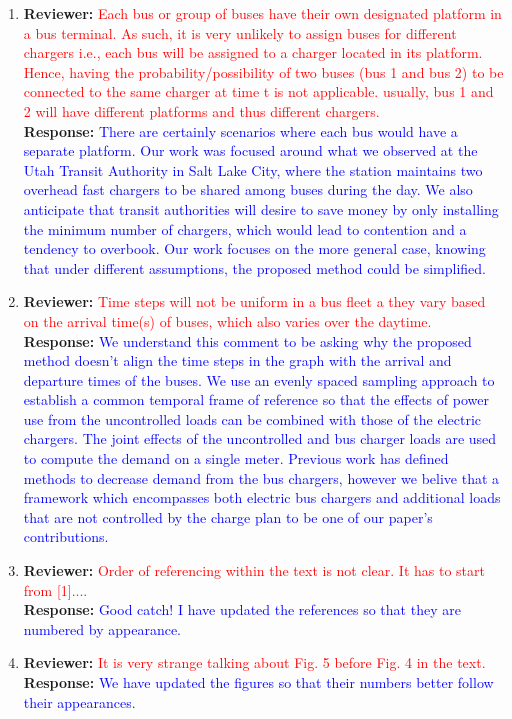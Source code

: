 \documentclass{article}
\newcommand\formatfeedback[2]
{%
	\textbf{Reviewer:} \textcolor{red}{#1} 
	\leavevmode\\[0.1in] \textbf{Response:} \textcolor{blue}{#2}
}
\begin{document}
\begin{enumerate}
	\item \formatfeedback{Each bus or group of buses have their own designated platform in a bus terminal. As such, it is very unlikely to assign buses for different chargers i.e., each bus will be assigned to a charger located in its platform. Hence, having the probability/possibility of  two buses (bus 1 and bus 2) to be connected to the same charger at time t is not applicable. usually, bus 1 and 2 will have different platforms and thus different chargers.}{There are certainly scenarios where each bus would have a separate platform. Our work was focused around what we observed at the Utah Transit Authority in Salt Lake City, where the station maintains two overhead fast chargers to be shared among buses during the day. We also anticipate that transit authorities will desire to save money by only installing the minimum number of chargers, which would lead to contention and a tendency to overbook. Our work focuses on the more general case, knowing that under different assumptions, the proposed method could be simplified.}
	\item \formatfeedback{Time steps will not be uniform in a bus fleet a they vary based on the arrival time(s) of buses, which also varies over the daytime.}{ We understand this comment to be asking why the proposed method doesn't align the time steps in the graph with the arrival and departure times of the buses. We use an evenly spaced sampling approach to establish a common temporal frame of reference so that the effects of power use from the uncontrolled loads can be combined with those of the electric chargers. The joint effects of the uncontrolled and bus charger loads are used to compute the demand on a single meter. Previous work has defined methods to decrease demand from the bus chargers, however we belive that a framework which encompasses both electric bus chargers and additional loads that are not controlled by the charge plan to be one of our paper's contributions.} 
	\item \formatfeedback{Order of referencing within the text is not clear. It has to start from [1]....}{Good catch! I have updated the references so that they are numbered by appearance.}
	\item \formatfeedback{It is very strange talking about Fig. 5 before Fig. 4 in the text.}{We have updated the figures so that their numbers better follow their appearances.}

\end{enumerate}
\end{document}
